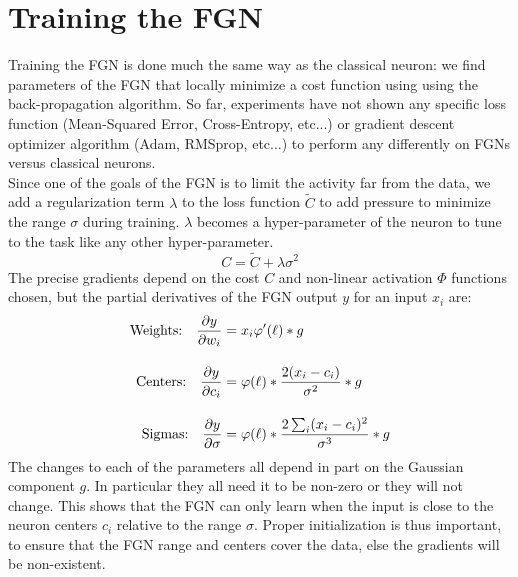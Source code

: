 \documentclass[12pt,oneside]{CUNY_PhD}
\begin{document}
\section{Training the FGN}
Training the FGN is done much the same way as the classical neuron: we find parameters of the FGN that locally minimize a cost function using using the back-propagation algorithm. So far, experiments have not shown any specific loss function (Mean-Squared Error, Cross-Entropy, etc...) or gradient descent optimizer algorithm (Adam, RMSprop, etc...) to perform any differently on FGNs versus classical neurons. \\
Since one of the goals of the FGN is to limit the activity far from the data, we add a regularization term $\lambda$ to the loss function $\tilde{C}$ to add pressure to minimize the range $\sigma$ during training. $\lambda$ becomes a hyper-parameter of the neuron to tune to the task like any other hyper-parameter.\\
\[C = \tilde{C} + \lambda\sigma^2\]
The precise gradients depend on the cost $C$ and non-linear activation $\Phi$ functions chosen, but the partial derivatives of the FGN output $y$ for an input $x_i$  are:
\begin{align*}
    \text{Weights:\quad} \frac{\partial y}{\partial w_i} &=  x_i \varphi'(\ell) * g  \\[1em]
    \text{Centers:\quad} \frac{\partial y}{\partial c_i} &= \varphi(\ell) * \frac{2(x_i-c_i)}{\sigma^2} * g \\[1em]
    \text{Sigmas:\quad} \frac{\partial y}{\partial \sigma} &= \varphi(\ell) * \frac{2\sum_{i}(x_i-c_i)^2}{\sigma^3}* g
\end{align*}
The changes to each of the parameters all depend in part on the Gaussian component $g$. In particular they all need it to be non-zero or they will not change. This shows that the FGN can only learn when the input is close to the neuron centers $c_i$ relative to the range $\sigma$. Proper initialization is thus important, to ensure that the FGN range and centers cover the data, else the gradients will be non-existent. \\
\end{document}
